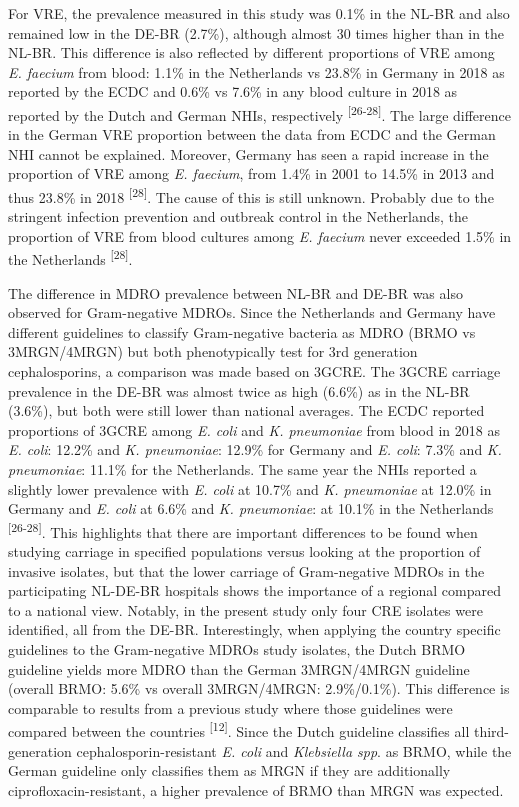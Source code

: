\documentclass[
]{book}
\begin{document}
For VRE, the prevalence measured in this study was 0.1\% in the NL-BR and also remained low in the DE-BR (2.7\%), although almost 30 times higher than in the NL-BR. This difference is also reflected by different proportions of VRE among \emph{E. faecium} from blood: 1.1\% in the Netherlands vs 23.8\% in Germany in 2018 as reported by the ECDC and 0.6\% vs 7.6\% in any blood culture in 2018 as reported by the Dutch and German NHIs, respectively \textsuperscript{{[}26-28{]}}. The large difference in the German VRE proportion between the data from ECDC and the German NHI cannot be explained. Moreover, Germany has seen a rapid increase in the proportion of VRE among \emph{E. faecium}, from 1.4\% in 2001 to 14.5\% in 2013 and thus 23.8\% in 2018 \textsuperscript{{[}28{]}}. The cause of this is still unknown. Probably due to the stringent infection prevention and outbreak control in the Netherlands, the proportion of VRE from blood cultures among \emph{E. faecium} never exceeded 1.5\% in the Netherlands \textsuperscript{{[}28{]}}.

The difference in MDRO prevalence between NL-BR and DE-BR was also observed for Gram-negative MDROs. Since the Netherlands and Germany have different guidelines to classify Gram-negative bacteria as MDRO (BRMO vs 3MRGN/4MRGN) but both phenotypically test for 3rd generation cephalosporins, a comparison was made based on 3GCRE. The 3GCRE carriage prevalence in the DE-BR was almost twice as high (6.6\%) as in the NL-BR (3.6\%), but both were still lower than national averages. The ECDC reported proportions of 3GCRE among \emph{E. coli} and \emph{K. pneumoniae} from blood in 2018 as \emph{E. coli}: 12.2\% and \emph{K. pneumoniae}: 12.9\% for Germany and \emph{E. coli}: 7.3\% and \emph{K. pneumoniae}: 11.1\% for the Netherlands. The same year the NHIs reported a slightly lower prevalence with \emph{E. coli} at 10.7\% and \emph{K. pneumoniae} at 12.0\% in Germany and \emph{E. coli} at 6.6\% and \emph{K. pneumoniae}: at 10.1\% in the Netherlands \textsuperscript{{[}26-28{]}}. This highlights that there are important differences to be found when studying carriage in specified populations versus looking at the proportion of invasive isolates, but that the lower carriage of Gram-negative MDROs in the participating NL-DE-BR hospitals shows the importance of a regional compared to a national view. Notably, in the present study only four CRE isolates were identified, all from the DE-BR. Interestingly, when applying the country specific guidelines to the Gram-negative MDROs study isolates, the Dutch BRMO guideline yields more MDRO than the German 3MRGN/4MRGN guideline (overall BRMO: 5.6\% vs overall 3MRGN/4MRGN: 2.9\%/0.1\%). This difference is comparable to results from a previous study where those guidelines were compared between the countries \textsuperscript{{[}12{]}}. Since the Dutch guideline classifies all third-generation cephalosporin-resistant \emph{E. coli} and \emph{Klebsiella spp}. as BRMO, while the German guideline only classifies them as MRGN if they are additionally ciprofloxacin-resistant, a higher prevalence of BRMO than MRGN was expected.
\end{document}
